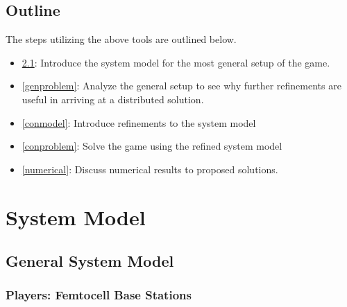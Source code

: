 \documentclass[12pt,a4paper]{report}
\begin{document}
\section{Outline}
The steps utilizing the above tools are outlined below. 
\begin{itemize}
\item 
\ref{genmodel}: Introduce the system model for the most general setup of the game.
\item 
\ref{genproblem}: Analyze the general setup to see why further refinements are useful in arriving at a distributed solution. 
\item
\ref{conmodel}: Introduce refinements to the system model 
\item 
\ref{conproblem}: Solve the game using the refined system model
\item 
\ref{numerical}: Discuss numerical results to proposed solutions. 
\end{itemize}
\chapter{System Model}

\section{General System Model}\label{genmodel}

\subsection{Players: Femtocell Base Stations}
\end{document}

